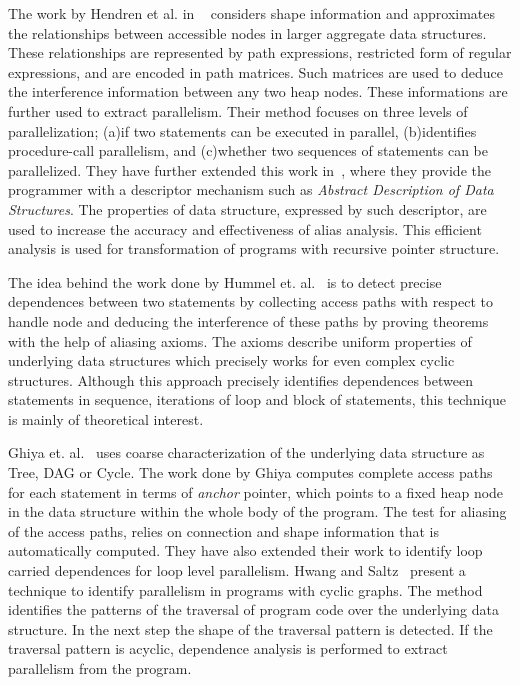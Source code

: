 The work by Hendren et al. in ~\cite{Hendren90parallel, Hendrenthesis} 
considers shape information and approximates the relationships between accessible
nodes in larger aggregate data structures. These relationships are represented by 
path expressions, restricted form of regular expressions, and are encoded in path 
matrices. Such matrices are used to deduce the interference 
information between any two heap nodes. These informations are further used to 
extract parallelism. Their method focuses on three levels of parallelization; 
(a)if two statements can be executed in parallel, (b)identifies procedure-call 
parallelism, and (c)whether two sequences of statements can be parallelized. They 
have further extended this work in~\cite{Hendren92abstractionsfor}, where they 
provide the programmer with a descriptor mechanism such as \emph{Abstract 
Description of Data Structures}. The properties of data structure, expressed 
by such descriptor, are used to increase the accuracy and effectiveness of 
alias analysis. This efficient analysis is used for transformation of programs 
with recursive pointer structure. 

The idea behind the work done by Hummel et. al.~\cite{Hummel94ageneral} is 
to detect precise dependences between two statements by collecting access 
paths with respect to handle node and deducing the interference of these 
paths by proving theorems with the help of aliasing axioms. The axioms 
describe uniform properties of underlying data structures which precisely 
works for even complex cyclic structures.  Although this approach precisely 
identifies dependences between statements in sequence, iterations of loop 
and block of statements, this technique is mainly of theoretical interest.  

Ghiya et. al.~\cite{ghiya98detecting} uses coarse
characterization of the underlying data structure as Tree,
DAG or Cycle. The work done by Ghiya computes complete access paths for 
each statement in terms of \emph{anchor} pointer, which points to a fixed 
heap node in the data structure within the whole body of the program. 
The test for aliasing of the access paths, relies on connection and shape 
information that is automatically computed. They have also extended 
their work to identify loop carried dependences for loop level parallelism. 
Hwang and Saltz~\cite{Hwang03Identify} present a technique to identify 
parallelism in programs with cyclic graphs. The method identifies the 
patterns of the traversal of program code over the underlying data structure. 
In the next step the shape of the traversal pattern is detected. If the 
traversal pattern is acyclic, dependence analysis is performed to extract 
parallelism from the program. 

